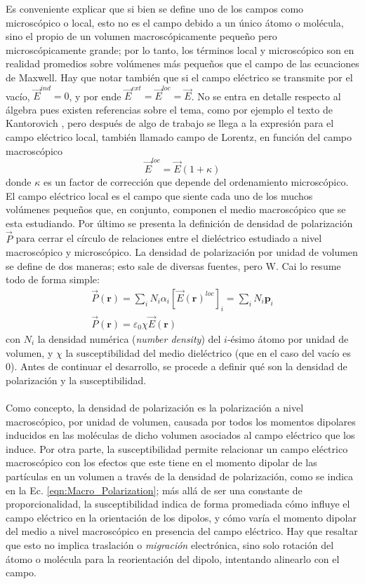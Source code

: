 \documentclass[12pt, oneside, numbers, spanish]{ezthesis}
\numberwithin{equation}{section}
\begin{document}
Es conveniente explicar que si bien se define uno de los campos como microscópico o local, esto no es el campo debido a un único átomo o molécula, sino el propio de un volumen macroscópicamente pequeño pero microscópicamente grande; por lo tanto, los términos local y microscópico son en realidad promedios sobre volúmenes más pequeños que el campo de las ecuaciones de Maxwell. Hay que notar también que si el campo eléctrico se transmite por el vacío, $\vec{E}^{ind} = 0$, y por ende $\vec{E}^{ext} = \vec{E}^{loc} = \vec{E}$. No se entra en detalle respecto al álgebra pues existen referencias sobre el tema, como por ejemplo el texto de Kantorovich \cite{Kantorovich}, pero después de algo de trabajo se llega a la expresión para el campo eléctrico local, también llamado campo de Lorentz, en función del campo macroscópico
\begin{equation}
\vec{E}^{loc} = \vec{E}(1 + \kappa)\label{eqn:Local_Field}
\end{equation}
donde $\kappa$ es un factor de corrección que depende del ordenamiento microscópico. El campo eléctrico local es el campo que siente cada uno de los muchos volúmenes pequeños que, en conjunto, componen el medio macroscópico que se esta estudiando. Por último se presenta la definición de densidad de polarización $\vec{P}$ para cerrar el círculo de relaciones entre el dieléctrico estudiado a nivel macroscópico y microscópico. La densidad de polarización por unidad de volumen se define de dos maneras; esto sale de diversas fuentes, pero W. Cai \cite{Cai} lo resume todo de forma simple:
\begin{gather}
\vec{P}(\mathbf{r}) = \sum_i N_i\alpha_i\left[\vec{E}(\mathbf{r})^{loc}\right]_i = \sum_i N_i\mathbf{p}_i\label{eqn:Micro_Polarization_sumation}\\
\vec{P}(\mathbf{r}) = \varepsilon_0\chi\vec{E}(\mathbf{r})\label{eqn:Macro_Polarization}
\end{gather}
con $N_i$ la densidad numérica (\textit{number density}) del $i$-ésimo átomo por unidad de volumen, y $\chi$ la susceptibilidad del medio dieléctrico (que en el caso del vacío es 0). Antes de continuar el desarrollo, se procede a definir qué son la densidad de polarización y la susceptibilidad.\\\\
Como concepto, la densidad de polarización es la polarización a nivel macroscópico, por unidad de volumen, causada por todos los momentos dipolares inducidos en las moléculas de dicho volumen asociados al campo eléctrico que los induce. Por otra parte, la susceptibilidad permite relacionar un campo eléctrico macroscópico con los efectos que este tiene en el momento dipolar de las partículas en un volumen a través de la densidad de polarización, como se indica en la Ec. \ref{eqn:Macro_Polarization}; más allá de ser una constante de proporcionalidad, la susceptibilidad indica de forma promediada cómo influye el campo eléctrico en la orientación de los dipolos, y cómo varía el momento dipolar del medio a nivel macroscópico en presencia del campo eléctrico. Hay que resaltar que esto no implica traslación o \textit{migración} electrónica, sino solo rotación del átomo o molécula para la reorientación del dipolo, intentando alinearlo con el campo.\\\\
\end{document}
